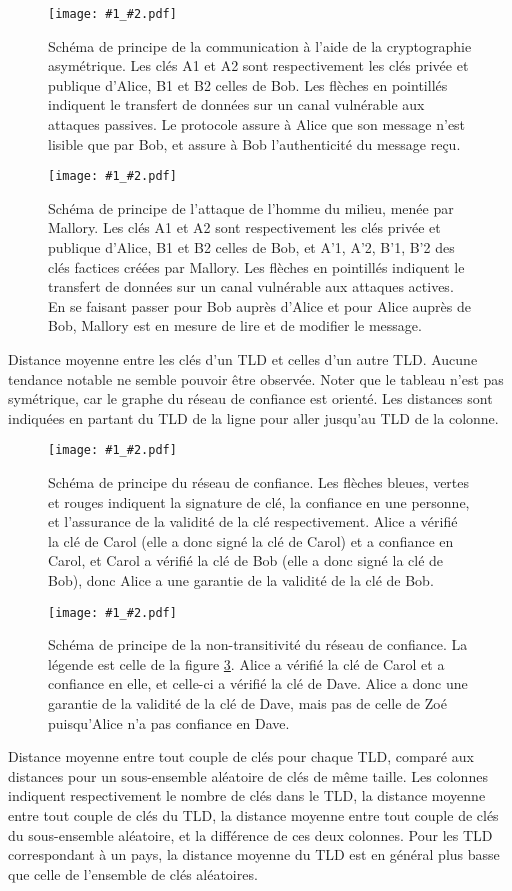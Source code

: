 \documentclass[a4paper]{article}
\title{\vtitle}
\author{Antoine Amarilli}
\date{}
\newcommand{\sch}[3]{
\begin{figure}
\centering
\texttt{[image: \#1\_\#2.pdf]}
\caption{#3}
\label{sch_#2}
\end{figure}
}
\newcommand{\tbl}[2]{
\begin{table}[p]
\centering

\caption{#2}
\label{#1}
\end{table}
}
\begin{document}
\sch{schemas/sch}{alice_bob}{Schéma de principe de la communication à l'aide de la cryptographie asymétrique. Les clés A1 et A2 sont respectivement les clés privée et publique d'Alice, B1 et B2 celles de Bob. Les flèches en pointillés indiquent le transfert de données sur un canal vulnérable aux attaques passives. Le protocole assure à Alice que son message n'est lisible que par Bob, et assure à Bob l'authenticité du message reçu.}

\sch{schemas/sch}{alice_bob_mallory}{Schéma de principe de l'attaque de l'homme du milieu, menée par Mallory. Les clés A1 et A2 sont respectivement les clés privée et publique d'Alice, B1 et B2 celles de Bob, et A'1, A'2, B'1, B'2 des clés factices créées par Mallory. Les flèches en pointillés indiquent le transfert de données sur un canal vulnérable aux attaques actives. En se faisant passer pour Bob auprès d'Alice et pour Alice auprès de Bob, Mallory est en mesure de lire et de modifier le message.}

\tbl{all_tlds_to_all_tlds.custom}{Distance moyenne entre les clés d'un TLD et celles d'un autre TLD. Aucune tendance notable ne semble pouvoir être observée. Noter que le tableau n'est pas symétrique, car le graphe du réseau de confiance est orienté. Les distances sont indiquées en partant du TLD de la ligne pour aller jusqu'au TLD de la colonne.}

\sch{schemas/sch}{alice_carol_bob}{Schéma de principe du réseau de confiance. Les flèches bleues, vertes et rouges indiquent la signature de clé, la confiance en une personne, et l'assurance de la validité de la clé respectivement. Alice a vérifié la clé de Carol (elle a donc signé la clé de Carol) et a confiance en Carol, et Carol a vérifié la clé de Bob (elle a donc signé la clé de Bob), donc Alice a une garantie de la validité de la clé de Bob.}

\sch{schemas/sch}{alice_carol_dave_zoe}{Schéma de principe de la non-transitivité du réseau de confiance. La légende est celle de la figure \ref{sch_alice_carol_bob}. Alice a vérifié la clé de Carol et a confiance en elle, et celle-ci a vérifié la clé de Dave. Alice a donc une garantie de la validité de la clé de Dave, mais pas de celle de Zoé puisqu'Alice n'a pas confiance en Dave.}


\tbl{all_tlds_vs_rand}{Distance moyenne entre tout couple de clés pour chaque TLD, comparé aux distances pour un sous-ensemble aléatoire de clés de même taille. Les colonnes indiquent respectivement le nombre de clés dans le TLD, la distance moyenne entre tout couple de clés du TLD, la distance moyenne entre tout couple de clés du sous-ensemble aléatoire, et la différence de ces deux colonnes. Pour les TLD correspondant à un pays, la distance moyenne du TLD est en général plus basse que celle de l'ensemble de clés aléatoires.}
\end{document}
